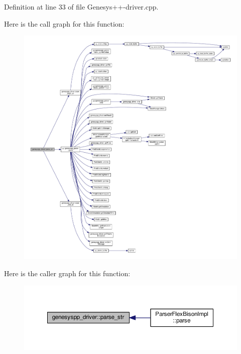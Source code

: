 Definition at line 33 of file Genesys++-\/driver.\-cpp.



Here is the call graph for this function\-:
\nopagebreak
\begin{figure}[H]
\begin{center}
\leavevmode
\includegraphics[width=350pt]{classgenesyspp__driver_a5e63bd1621e53aa24cf2dee47d53ebdc_cgraph}
\end{center}
\end{figure}




Here is the caller graph for this function\-:
\nopagebreak
\begin{figure}[H]
\begin{center}
\leavevmode
\includegraphics[width=350pt]{classgenesyspp__driver_a5e63bd1621e53aa24cf2dee47d53ebdc_icgraph}
\end{center}
\end{figure}


